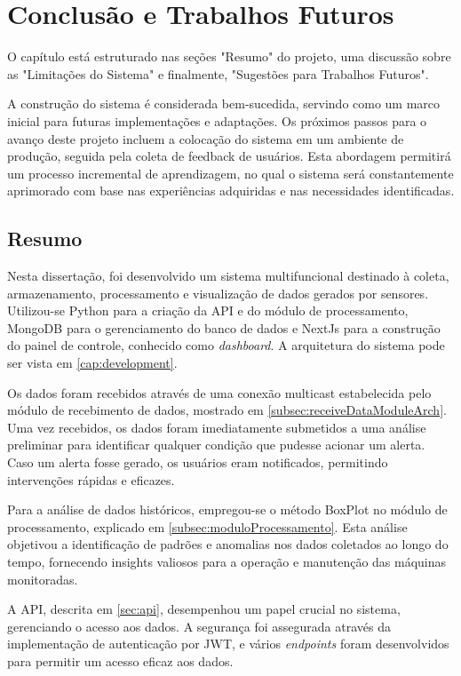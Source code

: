 \chapter{Conclusão e Trabalhos Futuros}\label{chap:conclusion_and_future_work}

O capítulo está estruturado nas seções "Resumo" do projeto, uma discussão sobre as "Limitações do Sistema" e finalmente, "Sugestões para Trabalhos Futuros". 

A construção do sistema é considerada bem-sucedida, servindo como um marco inicial para futuras implementações e adaptações. Os próximos passos para o avanço deste projeto incluem a colocação do sistema em um ambiente de produção, seguida pela coleta de feedback de usuários. Esta abordagem permitirá um processo incremental de aprendizagem, no qual o sistema será constantemente aprimorado com base nas experiências adquiridas e nas necessidades identificadas. 

\section{Resumo}\label{sec:summary}
Nesta dissertação, foi desenvolvido um sistema multifuncional destinado à coleta, armazenamento, processamento e visualização de dados gerados por sensores. Utilizou-se Python para a criação da \gls{API} e do módulo de processamento, MongoDB para o gerenciamento do banco de dados e NextJs para a construção do painel de controle, conhecido como \emph{dashboard}. A arquitetura do sistema pode ser vista em \ref{cap:development}.

Os dados foram recebidos através de uma conexão multicast estabelecida pelo módulo de recebimento de dados, mostrado em \ref{subsec:receiveDataModuleArch}. Uma vez recebidos, os dados foram imediatamente submetidos a uma análise preliminar para identificar qualquer condição que pudesse acionar um alerta. Caso um alerta fosse gerado, os usuários eram notificados, permitindo intervenções rápidas e eficazes.

Para a análise de dados históricos, empregou-se o método BoxPlot no módulo de processamento, explicado em \ref{subsec:moduloProcessamento}. Esta análise objetivou a identificação de padrões e anomalias nos dados coletados ao longo do tempo, fornecendo insights valiosos para a operação e manutenção das máquinas monitoradas.

A \gls{API}, descrita em \ref{sec:api}, desempenhou um papel crucial no sistema, gerenciando o acesso aos dados. A segurança foi assegurada através da implementação de autenticação por \gls{JWT}, e vários \emph{endpoints} foram desenvolvidos para permitir um acesso eficaz aos dados.

